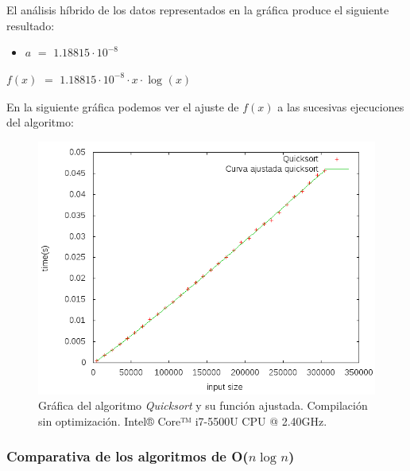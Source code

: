 \documentclass[11pt,a4paper]{article}
\begin{document}
				\par
				El análisis híbrido de los datos representados en la gráfica produce el siguiente resultado:

				\begin{itemize}

					\item
					$a$ $=$ $1.18815\cdot 10^{-8}$

				\end{itemize}

				\par
				$f(x)$ $=$ $ 1.18815\cdot 10^{-8}\cdot x \cdot \log_{}(x)$

\newpage

				\par
				En la siguiente gráfica podemos ver el ajuste de $f(x)$ a las sucesivas ejecuciones del algoritmo:

				\begin{figure}[h]

					\centering
					\includegraphics[width=1\textwidth]{quicksort_ajustado.png}
					\caption{Gráfica del algoritmo \textit{Quicksort} y su función ajustada. Compilación sin optimización. Intel® Core™ i7-5500U CPU @ 2.40GHz.}

				\end{figure}

\newpage

			\subsubsection{Comparativa de los algoritmos de O($n\log_{}n$)}
\end{document}
